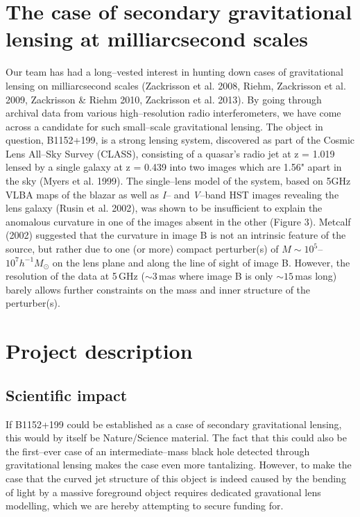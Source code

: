 \documentclass[a4paper, 11pt]{article}
\begin{document}
\section{The case of secondary gravitational lensing at milliarcsecond scales }
Our team has had a long--vested interest in hunting down cases of gravitational lensing on milliarcsecond scales (Zackrisson et al. 2008, Riehm, Zackrisson et al. 2009, Zackrisson \& Riehm 2010, Zackrisson et al. 2013). By going through archival data from various high--resolution radio interferometers, we have come across a candidate for such small--scale gravitational lensing. The object in question, B1152+199, is a strong lensing system, discovered as part of the Cosmic Lens All--Sky Survey (CLASS), consisting of a quasar's radio jet at z = 1.019 lensed by a single galaxy at z = 0.439 into two images which are 1.56" apart in the sky (Myers et al. 1999). The single--lens model of the system, based on 5GHz VLBA maps of the blazar as well as {\it I}-- and {\it V}--band HST images revealing the lens galaxy (Rusin et al. 2002), was shown to be insufficient to explain the anomalous curvature in one of the images absent in the other (Figure 3). Metcalf (2002) suggested that the curvature in image B is not an intrinsic feature of the source, but rather due to one (or more) compact perturber(s) of $M\sim10^5$--$10^7 h^{-1} M_\odot$ on the lens plane and along the line of sight of image B. However, the resolution of the data at 5\,GHz ($\sim3$\,mas where image B is only $\sim15$\,mas long) barely allows further constraints on the mass and inner structure of the perturber(s).


\section{Project description}

\subsection{Scientific impact}
If B1152+199 could be established as a case of secondary gravitational lensing, this would by itself be Nature/Science material. The fact that this could also be the first--ever case of an intermediate--mass black hole detected through gravitational lensing makes the case even more tantalizing. However, to make the case that the curved jet structure of this object is indeed caused by the bending of light by a massive foreground object requires dedicated gravational lens modelling, which we are hereby attempting to secure funding for.
\end{document}
